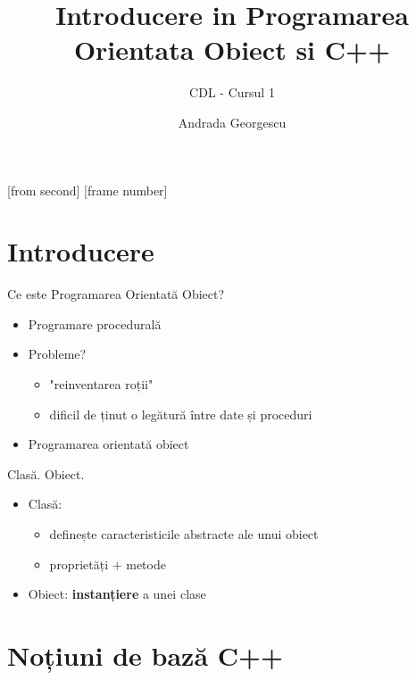 \documentclass{beamer}
\title[Introducere in POO]{Introducere in Programarea Orientata Obiect si C++}
\subtitle{CDL - Cursul 1}
\institute[ROSEdu]{ROSEdu}
\author[Andrada]{Andrada Georgescu}
\begin{document}
     

[from second]
[frame number]

\frame{\titlepage}

\begin{frame}
\tableofcontents
\end{frame}

\section{Introducere}

\begin{frame}{Ce este Programarea Orientată Obiect?}
  \begin{itemize} %
  \item Programare procedurală %
  \item Probleme? 
  \begin{itemize}  
  	\item "reinventarea roții"
	\item dificil de ținut o legătură între date și proceduri
  \end{itemize}
  \item Programarea orientată obiect %
  \end{itemize}
\end{frame}   

\begin{frame}{Clasă. Obiect.}
  \begin{itemize}
  \item Clasă:
  \begin{itemize}
	\item definește caracteristicile abstracte ale unui obiect	
    \item proprietăți + metode
  \end{itemize}
  \item Obiect: \textbf{instanțiere} a unei clase %
  \end{itemize}
\end{frame}

\section{Noțiuni de bază C++}
\end{document}
